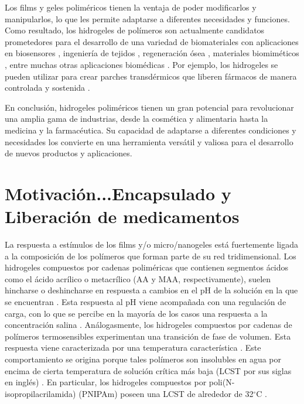 Los films y geles polim\'ericos tienen la ventaja de poder modificarlos y manipularlos, lo que les permite adaptarse a diferentes necesidades y funciones.
Como resultado, los hidrogeles de pol\'imeros son actualmente candidatos prometedores para el desarrollo de una variedad de biomateriales con aplicaciones en biosensores \cite{zhang2012ultrathin,islam2014responsive}, ingenier\'ia de tejidos \cite{matricardi2013interpenetrating,van2011biopolymer}, regeneraci\'on \'osea \cite{bai2018bioactive}, materiales biomim\'eticos \cite{green2016mimicking,wu2010multifunctional}, entre muchas otras aplicaciones biom\'edicas \cite{Daly2020}.
Por ejemplo, los hidrogeles se pueden utilizar para crear parches transd\'ermicos que liberen f\'armacos de manera controlada y sostenida \addcite.

En conclusi\'on, hidrogeles polim\'ericos tienen un gran potencial para revolucionar una amplia gama de industrias, desde la cosm\'etica y alimentaria hasta la medicina y la farmac\'eutica. Su capacidad de adaptarse a diferentes condiciones y necesidades los convierte en una herramienta vers\'atil y valiosa para el desarrollo de nuevos productos y aplicaciones.




\section{Motivaci\'on...Encapsulado y Liberaci\'on de medicamentos}

La respuesta a est\'imulos de los films y/o micro/nanogeles est\'a fuertemente ligada a la composici\'on de los pol\'imeros que forman parte de su red tridimensional.
Los hidrogeles compuestos por cadenas polim\'ericas que contienen segmentos \'acidos como el \'acido acr\'ilico o metacr\'ilico (AA y MAA, respectivamente), suelen hincharse o deshincharse en respuesta a cambios en el pH de la soluci\'on en la que se encuentran \cite{snowden1996colloidal}.
Esta respuesta al pH viene acompa\~nada con una regulaci\'on de carga, con lo que se percibe en la mayor\'ia de los casos una respuesta a la concentraci\'on salina \addcite.
An\'alogasmente, los hidrogeles compuestos por cadenas de pol\'imeros termosensibles experimentan una transici\'on de fase de volumen. Esta respuesta viene caracterizada por una temperatura caracter\'istica \cite{Pelton1986,Pelton2000}.
Este comportamiento se origina porque tales pol\'imeros son insolubles en agua por encima de cierta temperatura de soluci\'on cr\'itica m\'as baja (LCST por sus siglas en ingl\'es) \cite{Kawaguchi2020}.
En particular, los hidrogeles compuestos por poli(N-isopropilacrilamida) (PNIPAm) poseen una LCST de alrededor de 32$^\circ$C \cite{Schild1992}.

